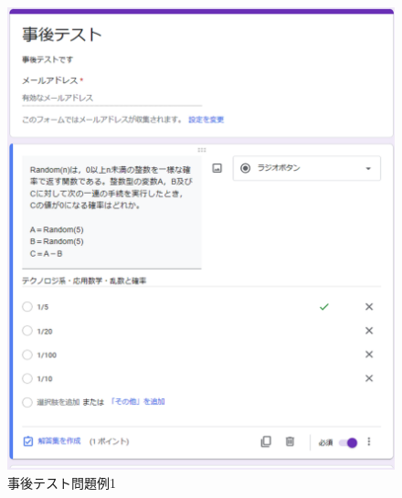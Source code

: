\begin{figure}[htbp]
\begin{center}
\includegraphics[width=16cm]{img/jigo1.eps}
\end{center}
\caption{事後テスト問題例1}
\label{fig:jigo1}
\end{figure}

